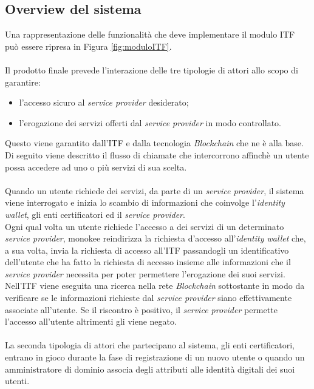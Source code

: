 \subsection{Overview del sistema}
Una rappresentazione delle funzionalità che deve implementare il modulo \gls{ITF} può essere ripresa in Figura \ref{fig:moduloITF}.\\\\
Il prodotto finale prevede l'interazione delle tre tipologie di attori allo scopo di garantire:
\begin{itemize}
	\item l'accesso sicuro al \textit{service provider} desiderato;
	\item l'erogazione dei servizi offerti dal \textit{service provider} in modo controllato.
\end{itemize}
Questo viene garantito dall'\gls{ITF} e dalla tecnologia \textit{Blockchain} che ne è alla base.\\
Di seguito viene descritto il flusso di chiamate che intercorrono affinchè un utente possa accedere ad uno o più servizi di sua scelta.\\\\
Quando un utente richiede dei servizi, da parte di un \textit{service provider}, il sistema viene interrogato e inizia lo scambio di informazioni che coinvolge l'\textit{identity wallet}, gli enti certificatori ed il \textit{service provider}.\\
Ogni qual volta un utente richiede l'accesso a dei servizi di un determinato \textit{service provider}, \gls{monokee} reindirizza la richiesta d'accesso all'\textit{identity wallet} che, a sua volta, invia la richiesta di accesso all'\gls{ITF} passandogli un identificativo dell'utente che ha fatto la richiesta di accesso insieme alle informazioni che il \textit{service provider} necessita per poter permettere l'erogazione dei suoi servizi.\\
Nell'\gls{ITF} viene eseguita una ricerca nella rete \textit{Blockchain} sottostante in modo da verificare se le informazioni richieste dal \textit{service provider} siano effettivamente associate all'utente. Se il riscontro è positivo, il \textit{service provider} permette l'accesso all'utente altrimenti gli viene negato.\\\\
La seconda tipologia di attori che partecipano al sistema, gli enti certificatori, entrano in gioco durante la fase di registrazione di un nuovo utente o quando un amministratore di dominio associa degli attributi alle identità digitali dei suoi utenti.
